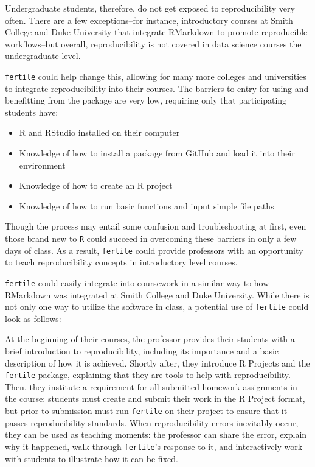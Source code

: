 \documentclass[12pt,twoside]{reedthesis}
\providecommand{\tightlist}{%
  \setlength{\itemsep}{0pt}\setlength{\parskip}{0pt}}
\begin{document}
Undergraduate students, therefore, do not get exposed to reproducibility
very often. There are a few exceptions--for instance, introductory
courses at Smith College and Duke University that integrate RMarkdown to
promote reproducible workflows--but overall, reproducibility is not
covered in data science courses the undergraduate level.

\texttt{fertile} could help change this, allowing for many more colleges
and universities to integrate reproducibility into their courses. The
barriers to entry for using and benefitting from the package are very
low, requiring only that participating students have:
\begin{itemize}
\tightlist
\item
  R and RStudio installed on their computer
\item
  Knowledge of how to install a package from GitHub and load it into
  their environment
\item
  Knowledge of how to create an R project
\item
  Knowledge of how to run basic functions and input simple file paths
\end{itemize}
Though the process may entail some confusion and troubleshooting at
first, even those brand new to \texttt{R} could succeed in overcoming
these barriers in only a few days of class. As a result,
\texttt{fertile} could provide professors with an opportunity to teach
reproducibility concepts in introductory level courses.

\texttt{fertile} could easily integrate into coursework in a similar way
to how RMarkdown was integrated at Smith College and Duke University.
While there is not only one way to utilize the software in class, a
potential use of \texttt{fertile} could look as follows:

At the beginning of their courses, the professor provides their students
with a brief introduction to reproducibility, including its importance
and a basic description of how it is achieved. Shortly after, they
introduce R Projects and the \texttt{fertile} package, explaining that
they are tools to help with reproducibility. Then, they institute a
requirement for all submitted homework assignments in the course:
students must create and submit their work in the R Project format, but
prior to submission must run \texttt{fertile} on their project to ensure
that it passes reproducibility standards. When reproducibility errors
inevitably occur, they can be used as teaching moments: the professor
can share the error, explain why it happened, walk through
\texttt{fertile}'s response to it, and interactively work with students
to illustrate how it can be fixed.
\end{document}
